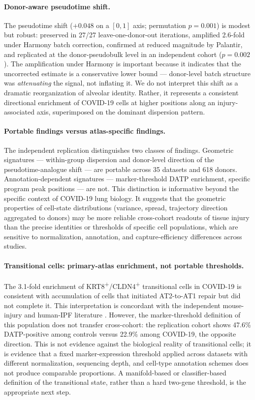 \documentclass[11pt]{article}
\begin{document}
\paragraph{Donor-aware pseudotime shift.} The pseudotime shift ($+0.048$ on a $[0,1]$ axis; permutation $p = 0.001$) is modest but robust: preserved in 27/27 leave-one-donor-out iterations, amplified 2.6-fold under Harmony batch correction, confirmed at reduced magnitude by Palantir, and replicated at the donor-pseudobulk level in an independent cohort ($p = 0.002$). The amplification under Harmony is important because it indicates that the uncorrected estimate is a conservative lower bound --- donor-level batch structure was \emph{attenuating} the signal, not inflating it. We do not interpret this shift as a dramatic reorganization of alveolar identity. Rather, it represents a consistent directional enrichment of COVID-19 cells at higher positions along an injury-associated axis, superimposed on the dominant dispersion pattern.

\paragraph{Portable findings versus atlas-specific findings.} The independent replication distinguishes two classes of findings. Geometric signatures --- within-group dispersion and donor-level direction of the pseudotime-analogue shift --- are portable across 35 datasets and 618 donors. Annotation-dependent signatures --- marker-threshold DATP enrichment, specific program peak positions --- are not. This distinction is informative beyond the specific context of COVID-19 lung biology. It suggests that the geometric properties of cell-state distributions (variance, spread, trajectory direction aggregated to donors) may be more reliable cross-cohort readouts of tissue injury than the precise identities or thresholds of specific cell populations, which are sensitive to normalization, annotation, and capture-efficiency differences across studies.

\paragraph{Transitional cells: primary-atlas enrichment, not portable thresholds.} The 3.1-fold enrichment of KRT8\textsuperscript{+}/CLDN4\textsuperscript{+} transitional cells in COVID-19 is consistent with accumulation of cells that initiated AT2-to-AT1 repair but did not complete it. This interpretation is concordant with the independent mouse-injury and human-IPF literature \citep{Kobayashi2020, Strunz2020, Adams2020, Habermann2020}. However, the marker-threshold definition of this population does not transfer cross-cohort: the replication cohort shows 47.6\% DATP-positive among controls versus 22.9\% among COVID-19, the opposite direction. This is not evidence against the biological reality of transitional cells; it is evidence that a fixed marker-expression threshold applied across datasets with different normalization, sequencing depth, and cell-type annotation schemes does not produce comparable proportions. A manifold-based or classifier-based definition of the transitional state, rather than a hard two-gene threshold, is the appropriate next step.
\end{document}
